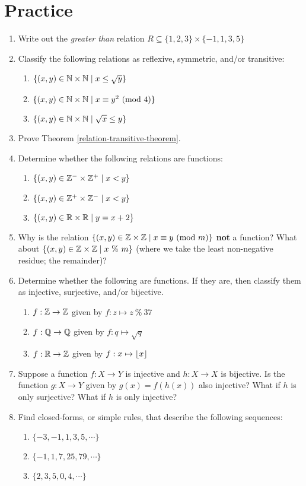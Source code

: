 \documentclass[main.tex]{subfiles}
\begin{document}
\section{Practice}

\begin{enumerate}
	\item Write out the \textit{greater than} relation \(R \subseteq \{1,2,3\} \times \{-1,1,3,5\}\)
	\item Classify the following relations as reflexive, symmetric, and/or transitive:
	\begin{enumerate}
		\item \(\{(x,y) \in \mathbb{N} \times \mathbb{N} \mid x \leq \sqrt{y}\}\)
		\item \(\{(x,y) \in \mathbb{N} \times \mathbb{N} \mid x \equiv y^2 \ (\mathrm{mod}\ 4)\}\)
		\item \(\{(x,y) \in \mathbb{N} \times \mathbb{N} \mid \sqrt{x} \leq y\}\)
	\end{enumerate}
	\item Prove Theorem \ref{relation-transitive-theorem}.
	\item Determine whether the following relations are functions:
	\begin{enumerate}
		\item \(\{(x,y) \in \mathbb{Z}^- \times \mathbb{Z}^+ \mid x < y\}\)
		\item \(\{(x,y) \in \mathbb{Z}^+ \times \mathbb{Z}^- \mid x < y\}\)
		\item \(\{(x,y) \in \mathbb{R}   \times \mathbb{R}   \mid y = x + 2\}\)
	\end{enumerate}
	\item
	Why is the relation \(\{(x,y) \in \mathbb{Z} \times \mathbb{Z} \mid x \equiv y \ (\mathrm{mod}\ m)\}\) \textbf{not} a function?
	What about \(\{(x,y) \in \mathbb{Z} \times \mathbb{Z} \mid x \ \% \ m\}\) (where we take the least non-negative residue; the remainder)?
	\item Determine whether the following are functions. If they are, then classify them as injective, surjective, and/or bijective.
	\begin{enumerate}
		\item \(f : \mathbb{Z} \rightarrow \mathbb{Z}\) given by \(f : z \mapsto z \ \%\ 37\)
		\item \(f : \mathbb{Q} \rightarrow \mathbb{Q}\) given by \(f : q \mapsto \sqrt{q}\)
		\item \(f : \mathbb{R} \rightarrow \mathbb{Z}\) given by \(f : x \mapsto \lfloor x\rfloor\)
	\end{enumerate}
	\item Suppose a function \(f : X \rightarrow Y\) is injective and \(h : X \rightarrow X\) is bijective. Is the function \(g : X \rightarrow Y\) given by \(g(x) = f(h(x))\) also injective? What if \(h\) is only surjective? What if \(h\) is only injective? %
	\item Find closed-forms, or simple rules, that describe the following sequences:
	\begin{enumerate}
		\item \(\{-3,-1,1,3,5,\cdots\}\) %
		\item \(\{-1, 1, 7, 25, 79, \cdots\}\) %
		\item \(\{2,3,5,0,4,\cdots\}\) %
	\end{enumerate}
\end{enumerate}
\end{document}
